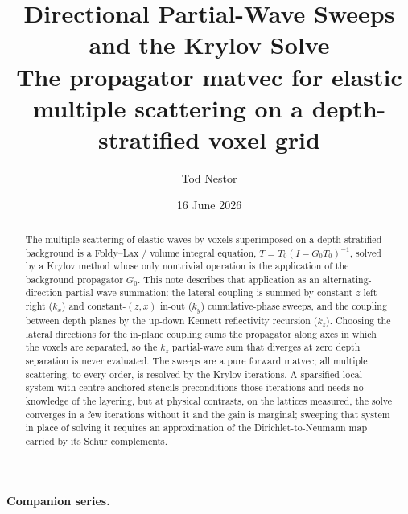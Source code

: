 \documentclass[11pt,a4paper]{article}
\title{\bfseries Directional Partial-Wave Sweeps and the Krylov Solve\\[4pt]
\large The propagator matvec for elastic multiple scattering on a
depth-stratified voxel grid}
\author{Tod Nestor}
\date{16 June 2026}
\newcommand{\Tz}{T_0}
\newcommand{\Gz}{G_0}
\begin{document}
\maketitle

\begin{abstract}
The multiple scattering of elastic waves by voxels superimposed on a depth-stratified
background is a Foldy--Lax / volume integral equation, $T=\Tz(I-\Gz\Tz)^{-1}$, solved by a
Krylov method whose only nontrivial operation is the application of the background propagator
$\Gz$. This note describes that application as an alternating-direction partial-wave summation:
the lateral coupling is summed by constant-$z$ left-right ($k_x$) and constant-$(z,x)$ in-out
($k_y$) cumulative-phase sweeps, and the coupling between depth planes by the up-down Kennett
reflectivity recursion ($k_z$). Choosing the lateral directions for the in-plane coupling sums
the propagator along axes in which the voxels are separated, so the $k_z$ partial-wave sum that
diverges at zero depth separation is never evaluated. The sweeps are a pure forward matvec; all
multiple scattering, to every order, is resolved by the Krylov iterations. A sparsified local
system with centre-anchored stencils preconditions those iterations and needs no knowledge of
the layering, but at physical contrasts, on the lattices measured, the solve converges in a few
iterations without it and the gain is marginal; sweeping that system in place of solving it
requires an approximation of the Dirichlet-to-Neumann map carried by its Schur complements.
\end{abstract}

\bigskip
\noindent\textbf{Companion series.}

\tableofcontents
\bigskip
\end{document}

